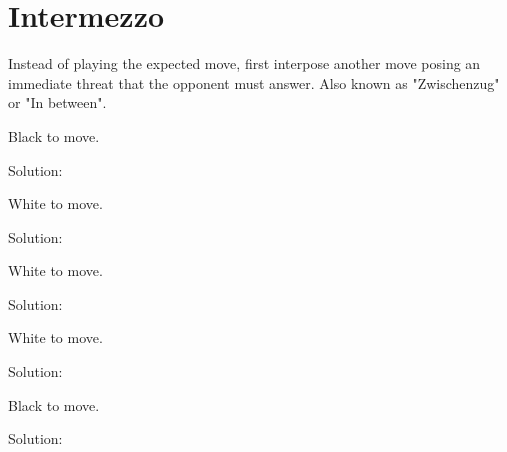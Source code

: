 \documentclass{book}
\begin{document}
\section{Intermezzo}
Instead of playing the expected move, first interpose another move posing an immediate threat that the opponent must answer. Also known as "Zwischenzug" or "In between".\begin{multicols}{2} 
\begin{samepage} 
\newgame 


 
\showboard
 
 Black to move. 
 
Solution: 
 
\end{samepage}\begin{samepage} 
\newgame 


 
\showboard
 
 White to move. 
 
Solution: 
 
\end{samepage}\begin{samepage} 
\newgame 


 
\showboard
 
 White to move. 
 
Solution: 
 
\end{samepage}\begin{samepage} 
\newgame 


 
\showboard
 
 White to move. 
 
Solution: 
 
\end{samepage}\begin{samepage} 
\newgame 


 
\showboard
 
 Black to move. 
 
Solution: 
 
\end{samepage}\end{multicols} 
\newpage 
\end{document}

